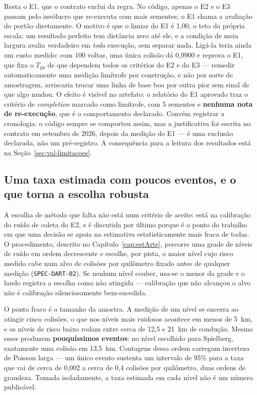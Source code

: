 Resta o E1, que o contrato exclui da regra. No código, apenas o E2 e o E3 passam
pelo invólucro que re-executa com mais sementes; o E1 chama a avaliação do
portão diretamente. O motivo é que o limiar do E1 é 1,00, o teto da própria
escala: um resultado perfeito tem distância zero até ele, e a condição de meia
largura avalia verdadeiro em \textit{toda} execução, sem separar nada. Ligá-la
teria ainda um custo medido: com 100 voltas, uma única colisão dá 0,9900 e
reprova o E1, que fixa o $T_{pp}$ de que dependem todos os critérios do E2 e do
E3 --- remedir automaticamente uma medição limítrofe por construção, e não por
sorte de amostragem, arriscaria trocar uma linha de base boa por outra pior sem
sinal de que algo mudou. O efeito é visível no artefato: o relatório do E1
aprovado traz o critério de \textit{completion} marcado como limítrofe, com 5
sementes e \textbf{nenhuma nota de re-execução}, que é o comportamento
declarado. Convém registrar a cronologia: o código sempre se comportou assim,
mas a justificativa foi escrita no contrato em setembro de 2026, depois da
medição do E1 --- é uma exclusão declarada, não um pré-registro. A consequência
para a leitura dos resultados está na Seção~\ref{sec:val-limitacoes}.

\subsection{Uma taxa estimada com poucos eventos, e o que torna a escolha
robusta}\label{sec:val-poisson}

A escolha de método que falta não está num critério de aceite: está na calibração do
ruído de coleta do E2, e é discutida por último porque é o ponto do trabalho em que
uma decisão se apoia na estimativa estatisticamente mais fraca de todas. O
procedimento, descrito no Capítulo~\ref{cap:estArte}, percorre uma grade de
níveis de ruído em ordem decrescente e escolhe, por pista, o maior nível cujo risco
medido cabe num alvo de colisões por quilômetro fixado antes de qualquer medição
(\texttt{SPEC-DART-02}). Se nenhum nível couber, usa-se o menor da grade e o laudo
registra a escolha como não atingida --- calibração que não alcançou o alvo não é
calibração silenciosamente bem-sucedida.

O ponto fraco é o tamanho da amostra. A medição de um nível se encerra ao
atingir cinco colisões, o que nos níveis mais ruidosos acontece em menos de
5~km, e os níveis de risco baixo rodam entre cerca de 12,5 e 21~km de condução.
Mesmo esses produzem \textbf{pouquíssimos eventos}: no nível escolhido para
Spielberg, exatamente uma colisão em 13,5~km. Contagens dessa ordem carregam
incerteza de Poisson larga --- um único evento sustenta um intervalo de 95\% para a
taxa que vai de cerca de 0,002 a cerca de 0,4 colisões por quilômetro, duas ordens
de grandeza. Tomada isoladamente, a taxa estimada em cada nível não é um número
publicável.

